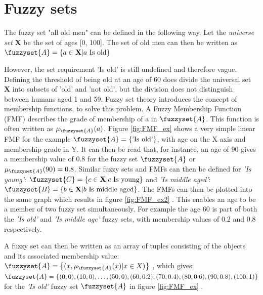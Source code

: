 \section{Fuzzy sets}
\label{sec:fuzzy_sets}
The fuzzy set "all old men" can be defined in the following way. Let the \textit{universe set} \textbf{X} be the set of ages [0, 100]. The set of old men can then be written as
$\fuzzyset{A}=\left \{ a \in \textbf{X} | a \text{ Is old} \right \}$
\cite{chen2000introduction}

However, the set requirement 'Is old' is still undefined and therefore vague. Defining the threshold of being old at an age of 60 does divide the universal set \textbf{X} into subsets of 'old' and 'not old', but the division does not distinguish between humans aged 1 and 59.
Fuzzy set theory introduces the concept of membership functions, to solve this problem. A Fuzzy Membership Function (FMF) describes the grade of membership of a  in  $\fuzzyset{A}$. This function is often written as $\mu_{\fuzzyset{A}}(a)$. Figure \ref{fig:FMF_ex} shows a very simple linear FMF for the example $\fuzzyset{A}=\left \{\text{'Is old'} \right \}$, with age on the X axis and membership grade in Y. It can then be read that, for instance, an age of 90 gives a membership value of 0.8 for the fuzzy set $\fuzzyset{A}$ or $\mu_{\fuzzyset{A}}(90)=0.8$. Similar fuzzy sets and  FMFs can then be defined for \textit{'Is young'}: $\fuzzyset{C}=\left \{ c \in \textbf{X} | c \text{ Is young} \right \}$ and   \textit{'Is middle aged'}: $\fuzzyset{B}=\left \{ b \in \textbf{X} | b \text{ Is middle aged} \right \}$. The FMFs can then be plotted into the same graph which results in figure \ref{fig:FMF_ex2} \cite{ross2009fuzzy}. This enables an age to be a member of two fuzzy set simultaneously. For example the age 60 is part of both the \textit{'Is old'} and \textit{'Is middle age'} fuzzy sets, with membership values of 0.2 and 0.8 respectively.

A fuzzy set can then be written as an array of tuples consisting of the objects and its associated membership value: $\fuzzyset{A}=\left \{(x,\mu_{\fuzzyset{A}}(x)|x \in X) \right \}$ \cite{zimmermann2010fuzzy}, which gives: \\ $\fuzzyset{A}=\left \{(0,0), (10,0), \dots, (50,0), (60,0.2), (70,0.4), (80,0.6), (90,0.8), (100,1) \right \}$ for the  \textit{'Is old'} fuzzy set $\fuzzyset{A}$  in figure \ref{fig:FMF_ex} \cite{ross2009fuzzy}.


